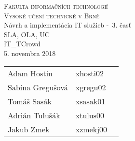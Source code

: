 \documentclass[a4paper, 11pt]{article}
\begin{document}
\begin{center}
\Huge
\textsc{Fakulta informačních technologií\\
Vysoké učení technické v Brně}
\\[84mm]
\LARGE Návrh a implementácia IT služieb \--\ 3. časť\\
\Huge SLA, OLA, UC\\
\vspace{3.5cm}
\LARGE IT\_TCrowd\\
\Large 5. novembra 2018
\end{center}

\hfill

\begin{minipage}[l]{0.6 \textwidth}
\Large
\begin{tabular}{l l l}
Adam Hostin  & xhosti02\\
Sabína Gregušová & xgregu02\\
Tomáš Sasák & xsasak01 \\
Adrián Tulušák  & xtulus00 \\
Jakub Zmek & xzmekj00 \\
\end{tabular}
\end{minipage}
\thispagestyle{empty}
\clearpage
\end{document}
